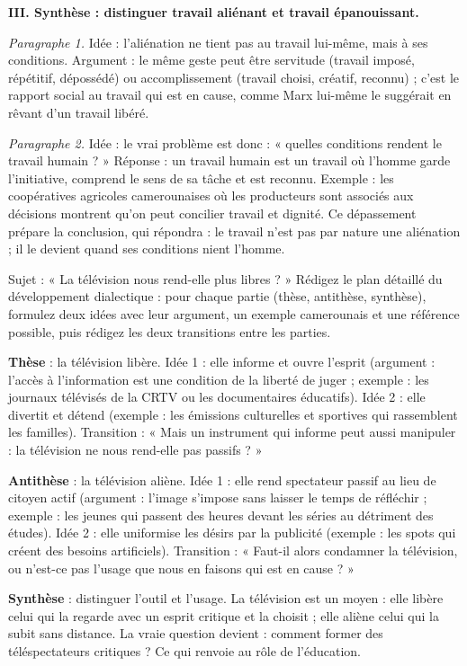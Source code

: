 \documentclass[11pt]{article}
\begin{document}
\begin{exoresolu}
\par\smallskip
\textbf{III. Synthèse : distinguer travail aliénant et travail épanouissant.}
\par
\emph{Paragraphe 1.} Idée : l'aliénation ne tient pas au travail lui-même, mais à ses conditions. Argument : le même geste peut être servitude (travail imposé, répétitif, dépossédé) ou accomplissement (travail choisi, créatif, reconnu) ; c'est le rapport social au travail qui est en cause, comme Marx lui-même le suggérait en rêvant d'un travail libéré.
\par
\emph{Paragraphe 2.} Idée : le vrai problème est donc : « quelles conditions rendent le travail humain ? » Réponse : un travail humain est un travail où l'homme garde l'initiative, comprend le sens de sa tâche et est reconnu. Exemple : les coopératives agricoles camerounaises où les producteurs sont associés aux décisions montrent qu'on peut concilier travail et dignité. Ce dépassement prépare la conclusion, qui répondra : le travail n'est pas par nature une aliénation ; il le devient quand ses conditions nient l'homme.
\end{exoresolu}

\begin{exercice}
Sujet : « La télévision nous rend-elle plus libres ? » Rédigez le plan détaillé du développement dialectique : pour chaque partie (thèse, antithèse, synthèse), formulez deux idées avec leur argument, un exemple camerounais et une référence possible, puis rédigez les deux transitions entre les parties.
\end{exercice}

\begin{corrige}
\textbf{Thèse} : la télévision libère. Idée 1 : elle informe et ouvre l'esprit (argument : l'accès à l'information est une condition de la liberté de juger ; exemple : les journaux télévisés de la CRTV ou les documentaires éducatifs). Idée 2 : elle divertit et détend (exemple : les émissions culturelles et sportives qui rassemblent les familles). Transition : « Mais un instrument qui informe peut aussi manipuler : la télévision ne nous rend-elle pas passifs ? »
\par
\textbf{Antithèse} : la télévision aliène. Idée 1 : elle rend spectateur passif au lieu de citoyen actif (argument : l'image s'impose sans laisser le temps de réfléchir ; exemple : les jeunes qui passent des heures devant les séries au détriment des études). Idée 2 : elle uniformise les désirs par la publicité (exemple : les spots qui créent des besoins artificiels). Transition : « Faut-il alors condamner la télévision, ou n'est-ce pas l'usage que nous en faisons qui est en cause ? »
\par
\textbf{Synthèse} : distinguer l'outil et l'usage. La télévision est un moyen : elle libère celui qui la regarde avec un esprit critique et la choisit ; elle aliène celui qui la subit sans distance. La vraie question devient : comment former des téléspectateurs critiques ? Ce qui renvoie au rôle de l'éducation.
\end{corrige}
\end{document}

